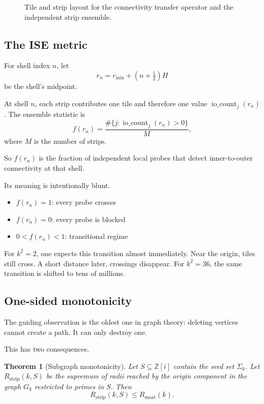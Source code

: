 \documentclass[12pt,letterpaper]{article}
\newtheorem{theorem}{Theorem}[section]
\theoremstyle{definition}
\theoremstyle{remark}
\newcommand{\Zi}{\mathbb{Z}[i]}
\newcommand{\Rmoat}{R_{\mathrm{moat}}}
\newcommand{\Rstrip}{R_{\mathrm{strip}}}
\newcommand{\Sigmak}{\Sigma_k}
\newcommand{\Gk}{G_k}
\newcommand{\iocount}{\operatorname{io\_count}}
\begin{document}
\begin{figure}[t]
\centering
\caption{Tile and strip layout for the connectivity transfer operator and the independent strip ensemble.}
\end{figure}

\subsection{The ISE metric}

For shell index $n$, let
\[
r_n=r_{\min}+\left(n+\tfrac12\right)H
\]
be the shell's midpoint.

At shell $n$, each strip contributes one tile and therefore one value $\iocount_{j}(r_n)$. The ensemble statistic is
\[
f(r_n)
=
\frac{\#\{j : \iocount_{j}(r_n)>0\}}{M},
\]
where $M$ is the number of strips.

So $f(r_n)$ is the fraction of independent local probes that detect inner-to-outer connectivity at that shell.

Its meaning is intentionally blunt.

\begin{itemize}
\item $f(r_n)=1$: every probe crosses
\item $f(r_n)=0$: every probe is blocked
\item $0<f(r_n)<1$: transitional regime
\end{itemize}

For $k^2=2$, one expects this transition almost immediately. Near the origin, tiles still cross. A short distance later, crossings disappear. For $k^2=36$, the same transition is shifted to tens of millions.

\subsection{One-sided monotonicity}

The guiding observation is the oldest one in graph theory: deleting vertices cannot create a path. It can only destroy one.

This has two consequences.

\begin{theorem}[Subgraph monotonicity]
Let $S\subseteq \Zi$ contain the seed set $\Sigmak$.
Let $\Rstrip(k,S)$ be the supremum of radii reached by the origin component in the graph $\Gk$ restricted to primes in $S$.
Then
\[
\Rstrip(k,S)\le \Rmoat(k).
\]
\end{theorem}
\end{document}
